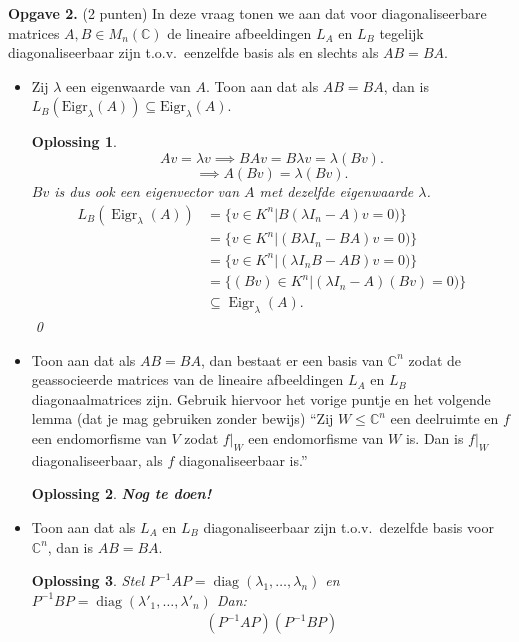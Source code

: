 \documentclass[a4paper,12pt]{article}
\newtheorem{oplossing}{Oplossing}
\begin{document}
\begin{enumerate}
\textbf{Opgave 2.} (2 punten) In deze vraag tonen we aan dat voor diagonaliseerbare matrices $A, B \in M_n(\mathbb{C})$ de lineaire afbeeldingen $L_A$ en $L_B$ tegelijk diagonaliseerbaar zijn t.o.v.\ eenzelfde basis als en slechts als $AB = BA$.
\begin{itemize}
    \item[(i)] Zij $\lambda$ een eigenwaarde van $A$. Toon aan dat als $AB = BA$, dan is $L_B(\text{Eigr}_\lambda(A)) \subseteq \text{Eigr}_\lambda(A)$.
    \begin{oplossing}
        \[A v = \lambda v \implies BAv = B\lambda v = \lambda (Bv). \]
        \[\implies A(Bv) = \lambda(Bv).\]
        \(Bv\) is dus ook een eigenvector van \(A\) met dezelfde eigenwaarde \(\lambda\).
        \begin{align*}
            L_B (\operatorname{Eigr}_\lambda (A)) 
            &= \{ v\in K^n | B(\lambda I_n - A)v = 0)\} \\
            &= \{ v\in K^n | (B\lambda I_n - BA)v = 0)\} \\
            &=\{ v\in K^n | (\lambda I_n B - A B)v = 0)\} \\
            &= \{ (Bv)\in K^n | (\lambda I_n - A)(Bv) = 0)\}\\
            &\subseteq \operatorname{Eigr}_\lambda (A).
        \end{align*}\qed
    \end{oplossing}
    \item[(ii)] Toon aan dat als $AB = BA$, dan bestaat er een basis van $\mathbb{C}^n$ zodat de geassocieerde matrices van de lineaire afbeeldingen $L_A$ en $L_B$ diagonaalmatrices zijn. Gebruik hiervoor het vorige puntje en het volgende lemma (dat je mag gebruiken zonder bewijs) ``Zij $W \leq \mathbb{C}^n$ een deelruimte en $f$ een endomorfisme van $V$ zodat $f|_W$ een endomorfisme van $W$ is. Dan is $f|_W$ diagonaliseerbaar, als $f$ diagonaliseerbaar is.''
    \begin{oplossing}
        \textbf{Nog te doen!}
    \end{oplossing}
    \item[(iii)] Toon aan dat als $L_A$ en $L_B$ diagonaliseerbaar zijn t.o.v.\ dezelfde basis voor $\mathbb{C}^n$, dan is $AB = BA$.
    \begin{oplossing}
        Stel \(P^{-1} A P = \operatorname{diag}(\lambda_1,\dots,\lambda_n)\) en \(P^{-1} B P = \operatorname{diag}(\lambda'_1,\dots,\lambda'_n)\) 
        Dan:
        \begin{align*}
            (P^{-1} A P)(P^{-1} B P) 

\end{align*}
\end{oplossing}
\end{itemize}
\end{enumerate}
\end{document}
